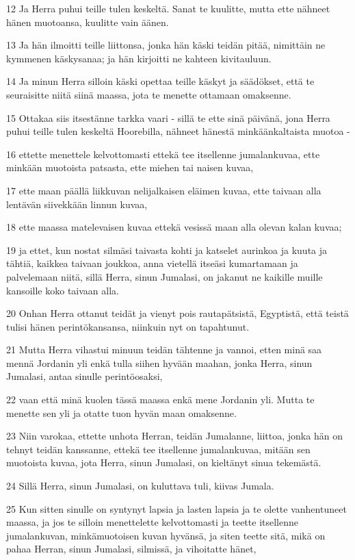 \par 12 Ja Herra puhui teille tulen keskeltä. Sanat te kuulitte, mutta ette nähneet hänen muotoansa, kuulitte vain äänen.
\par 13 Ja hän ilmoitti teille liittonsa, jonka hän käski teidän pitää, nimittäin ne kymmenen käskysanaa; ja hän kirjoitti ne kahteen kivitauluun.
\par 14 Ja minun Herra silloin käski opettaa teille käskyt ja säädökset, että te seuraisitte niitä siinä maassa, jota te menette ottamaan omaksenne.
\par 15 Ottakaa siis itsestänne tarkka vaari - sillä te ette sinä päivänä, jona Herra puhui teille tulen keskeltä Hoorebilla, nähneet hänestä minkäänkaltaista muotoa -
\par 16 ettette menettele kelvottomasti ettekä tee itsellenne jumalankuvaa, ette minkään muotoista patsasta, ette miehen tai naisen kuvaa,
\par 17 ette maan päällä liikkuvan nelijalkaisen eläimen kuvaa, ette taivaan alla lentävän siivekkään linnun kuvaa,
\par 18 ette maassa matelevaisen kuvaa ettekä vesissä maan alla olevan kalan kuvaa;
\par 19 ja ettet, kun nostat silmäsi taivasta kohti ja katselet aurinkoa ja kuuta ja tähtiä, kaikkea taivaan joukkoa, anna vietellä itseäsi kumartamaan ja palvelemaan niitä, sillä Herra, sinun Jumalasi, on jakanut ne kaikille muille kansoille koko taivaan alla.
\par 20 Onhan Herra ottanut teidät ja vienyt pois rautapätsistä, Egyptistä, että teistä tulisi hänen perintökansansa, niinkuin nyt on tapahtunut.
\par 21 Mutta Herra vihastui minuun teidän tähtenne ja vannoi, etten minä saa mennä Jordanin yli enkä tulla siihen hyvään maahan, jonka Herra, sinun Jumalasi, antaa sinulle perintöosaksi,
\par 22 vaan että minä kuolen tässä maassa enkä mene Jordanin yli. Mutta te menette sen yli ja otatte tuon hyvän maan omaksenne.
\par 23 Niin varokaa, ettette unhota Herran, teidän Jumalanne, liittoa, jonka hän on tehnyt teidän kanssanne, ettekä tee itsellenne jumalankuvaa, mitään sen muotoista kuvaa, jota Herra, sinun Jumalasi, on kieltänyt sinua tekemästä.
\par 24 Sillä Herra, sinun Jumalasi, on kuluttava tuli, kiivas Jumala.
\par 25 Kun sitten sinulle on syntynyt lapsia ja lasten lapsia ja te olette vanhentuneet maassa, ja jos te silloin menettelette kelvottomasti ja teette itsellenne jumalankuvan, minkämuotoisen kuvan hyvänsä, ja siten teette sitä, mikä on pahaa Herran, sinun Jumalasi, silmissä, ja vihoitatte hänet,

